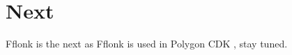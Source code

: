 \section{Next}

    Fflonk \cite{website:Fflonk} is the next as Fflonk is used in Polygon CDK \cite{website:Polygon-CDK}, stay tuned.


    
